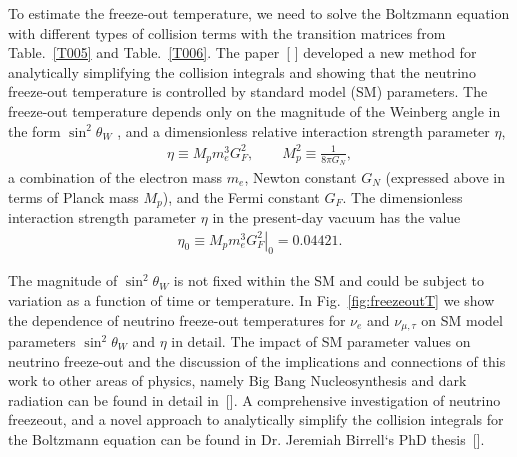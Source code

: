To estimate the freeze-out temperature, we need to solve the Boltzmann equation with different types of collision terms with the transition matrices from Table.~\ref{T005} and Table.~\ref{T006}. The paper~[\cite{Birrell:2014uka} ] developed a new method for analytically simplifying the collision integrals and showing that the neutrino freeze-out temperature is controlled by standard model (SM) parameters. The freeze-out temperature depends only on the magnitude of the Weinberg angle in the form $\sin^2\theta_W$ , and a dimensionless relative interaction strength parameter $\eta$,
\begin{align}
\eta\equiv M_p m_e^3 G_F^2, \qquad M_p^2\equiv \frac{1}{8\pi G_N}, \end{align}
a combination of the electron mass $m_e$, Newton constant $G_N$ (expressed above in terms of Planck mass $M_p$), and the Fermi constant $G_F$. The dimensionless interaction strength parameter $\eta$ in the present-day vacuum has the value
\begin{align}
\eta_0\equiv \left.M_p m_e^3 G_F^2\right|_0 = 0.04421 .
\end{align}

The magnitude of $\sin^2\theta_W$ is not fixed within the SM and could be subject to variation as a function of time or temperature. In Fig.~\ref{fig:freezeoutT} we show the dependence of neutrino freeze-out temperatures for $\nu_e$ and $\nu_{\mu,\tau}$ on SM model parameters $\sin^2\theta_W$ and $\eta$ in detail. The impact of SM parameter values on neutrino freeze-out and the discussion of the implications and connections of this work to other areas of physics, namely Big Bang Nucleosynthesis and dark radiation can be found in detail in~[\cite{Dreiner:2011fp,Boehm:2012gr,Blennow:2012de,Birrell:2014uka}]. A comprehensive investigation of neutrino freezeout, and a novel approach to analytically simplify the collision integrals for the Boltzmann equation can be found in Dr. Jeremiah Birrell‘s PhD thesis~[\cite{Birrell:2014ona}].


